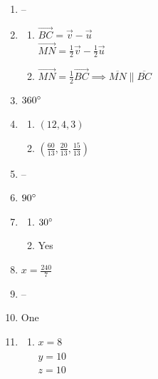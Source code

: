 \documentclass{article}
\begin{document}
\begin{enumerate}
\item --

\item

	\begin{enumerate}
	
	\item	$\overrightarrow{BC} = \vec{v} - \vec{u}$ \\
		$\overrightarrow{MN} = \frac{1}{2}\vec{v} - \frac{1}{2}\vec{u}$
		
	\item $\overrightarrow{MN} = \frac{1}{2} \overrightarrow{BC} \implies \overline{MN} \parallel \overline{BC}$
	
	\end{enumerate}

\item $360\degree$

\item
	\begin{enumerate}
	
	\item $(12, 4, 3)$
	
	\item $\left( \frac{60}{13}, \frac{20}{13}, \frac{15}{13} \right)$
	
	\end{enumerate}
	
\item --

\item $90 \degree$

\item

	\begin{enumerate}
	
	\item $30 \degree$
	
	\item Yes
	
	\end{enumerate}

\item $x = \frac{240}{7}$

\item --

\item One

\item

	\begin{enumerate}
	
	\item $x = 8$ \\
		$y = 10$ \\
		$z = 10$
	

\end{enumerate}
\end{enumerate}
\end{document}
